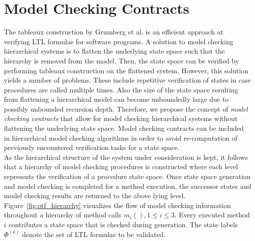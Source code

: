 \documentclass[a4paper, 12pt, twoside]{report}
\begin{document}
	\section{Model Checking Contracts}
	
	The tableaux construction by Grumberg et al. \cite{bhat1995efficient} is an efficient approach at verifying LTL formulae for software programs. A solution to model checking hierarchical systems is to flatten the underlying state space such that the hierarchy is removed from the model. Then, the state space can be verified by performing tableaux construction on the flattened system. However, this solution yields a number of problems. These include repetitive verification of states in case procedures are called multiple times. Also the size of the state space resulting from flattening a hierarchical model can become unboundedly large due to possibly unbounded recursion depth. Therefore, we propose the concept of \textit{model checking contracts}  that allow for model checking hierarchical systems without flattening the underlying state space. Model checking contracts can be included in hierarchical model checking algorithms in order to avoid re-computation of previously encountered verification tasks for a state space.\\
		
	As the hierarchical structure of the system under consideration is kept, it follows that a hierarchy of model checking procedures is constructed where each level represents the verification of a procedure state space. Once state space generation and model checking is completed for a method execution, the successor states and model checking results are returned to the above lying level. Figure~\ref{fig:otf_hierarchy} visualizes the flow of model checking information throughout a hierarchy of method calls $m_i(), 1 \leq i \leq 3$. Every executed method $i$ contributes a state space that is checked during generation. The state labels $\Phi^{(k)}$ denote the set of LTL formulae to be validated.\\	
\end{document}
